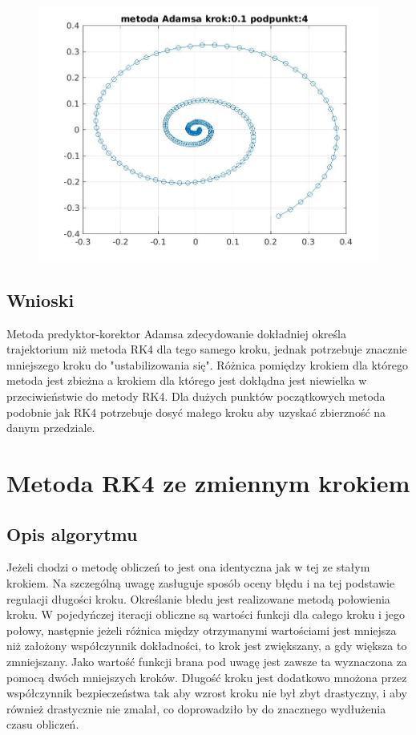 \documentclass[a4paper, 11pt]{article}
\begin{document}
\begin{figure}[H]
\centering
\includegraphics[width = 15cm]{2d/metoda Adamsa krok:0,1 podpunkt:4.jpg}
\end{figure}

\subsection{Wnioski}
Metoda predyktor-korektor Adamsa zdecydowanie dokładniej określa trajektorium niż metoda RK4 dla tego samego kroku, jednak potrzebuje znacznie mniejszego kroku do "ustabilizowania się". Różnica pomiędzy krokiem dla którego metoda jest zbieżna a krokiem dla którego jest dokłądna jest niewielka w przeciwieństwie do metody RK4. Dla dużych punktów początkowych metoda podobnie jak RK4 potrzebuje dosyć małego kroku aby uzyskać zbierzność na danym przedziale. 

\section{Metoda RK4 ze zmiennym krokiem}
\subsection{Opis algorytmu}
Jeżeli chodzi o metodę obliczeń to jest ona identyczna jak w tej ze stałym krokiem. Na szczególną uwagę zasługuje sposób oceny błędu i na tej podstawie regulacji długości kroku. Określanie błedu jest realizowane metodą połowienia kroku. W pojedyńczej iteracji obliczne są wartości funkcji dla całego kroku i jego połowy, następnie jeżeli różnica między otrzymanymi wartościami jest mniejsza niż założony współczynnik dokładności, to krok jest zwiększany, a gdy większa to zmniejszany. Jako wartość funkcji brana pod uwagę jest zawsze ta wyznaczona za pomocą dwóch mniejszych kroków. Długość kroku jest dodatkowo mnożona przez współczynnik bezpieczeństwa tak aby wzrost kroku nie był zbyt drastyczny, i aby również drastycznie nie zmalał, co doprowadziło by do znacznego wydłużenia czasu obliczeń. 
\end{document}
